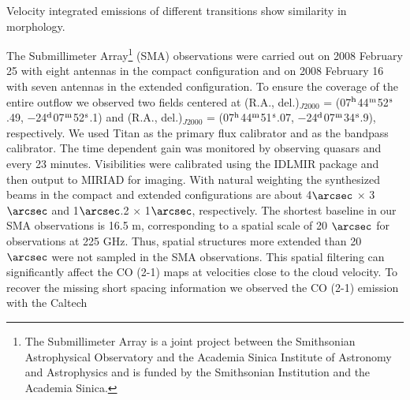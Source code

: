Velocity integrated emissions of different transitions show similarity in morphology. 





















The Submillimeter Array\footnote{    The Submillimeter Array is a joint project between the Smithsonian Astrophysical Observatory and the Academia Sinica Institute of Astronomy and Astrophysics and is funded by the Smithsonian Institution and the Academia Sinica.} (SMA) observations were carried out on 2008 February 25 with eight antennas in the compact configuration and on 2008 February 16 with seven antennas in the extended configuration. To ensure the coverage of the entire outflow we observed two fields centered at (R.A., del.)$_{J2000}$ = (07$^\textup{h}$44$^\textup{m}$52$^\textup{s}$.49, −24$^\textup{d}$07$^\textup{m}$52$^\textup{s}$.1) and (R.A., del.)$_{J2000}$ = (07$^\textup{h}$44$^\textup{m}$51$^\textup{s}$.07, −24$^\textup{d}$07$^\textup{m}$34$^\textup{s}$.9), respectively. We used Titan as the primary flux calibrator and  as the bandpass calibrator. The time dependent gain was monitored
by observing quasars  and  every 23 minutes. Visibilities were calibrated using the IDLMIR package and then output to MIRIAD for imaging. With natural weighting the synthesized beams in the compact and extended configurations are about 4${\arcsec}$ $\times$ 3${\arcsec}$ and 1${\arcsec}$.2 $\times$ 1${\arcsec}$, respectively. The shortest baseline in our SMA observations is 16.5 m, corresponding to a spatial scale of 20 ${\arcsec}$ for observations at 225 GHz. Thus, spatial structures more extended than 20 ${\arcsec}$ were not sampled in the SMA observations. This spatial filtering can significantly affect the CO (2-1) maps at velocities close to the cloud velocity. To recover the missing short spacing information we observed the CO (2-1) emission with the Caltech
